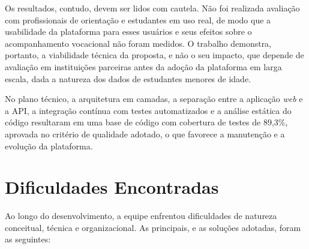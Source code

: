 Os resultados, contudo, devem ser lidos com cautela. Não foi realizada avaliação com profissionais de orientação e estudantes em uso real, de modo que a usabilidade da plataforma para esses usuários e seus efeitos sobre o acompanhamento vocacional não foram medidos. O trabalho demonstra, portanto, a viabilidade técnica da proposta, e não o seu impacto, que depende de avaliação em instituições parceiras antes da adoção da plataforma em larga escala, dada a natureza dos dados de estudantes menores de idade.

No plano técnico, a arquitetura em camadas, a separação entre a aplicação \textit{web} e a API, a integração contínua com testes automatizados e a análise estática do código resultaram em uma base de código com cobertura de testes de 89,3\%, aprovada no critério de qualidade adotado, o que favorece a manutenção e a evolução da plataforma.

\section{Dificuldades Encontradas}

Ao longo do desenvolvimento, a equipe enfrentou dificuldades de natureza conceitual, técnica e organizacional. As principais, e as soluções adotadas, foram as seguintes:

